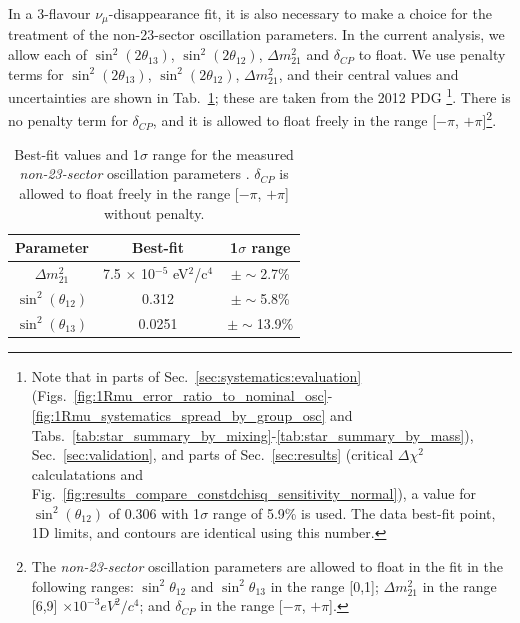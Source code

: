 In a 3-flavour $\nu_{\mu}$-disappearance fit, it is also necessary to make a choice for the treatment of the 
non-23-sector oscillation parameters. In the current analysis, we allow each of
$\sin^{2}(2 \theta_{13})$, $\sin^{2}(2 \theta_{12})$, $\Delta m_{21}^{2}$ and $\delta_{CP}$ to float. 
We use penalty terms for $\sin^{2}(2 \theta_{13})$, $\sin^{2}(2 \theta_{12})$, $\Delta m_{21}^{2}$, and their central values 
and uncertainties are shown in Tab.\ \ref{tab:pdg2012non23}; these are taken from the 2012 PDG \cite{PDG2012}\footnote{
  Note that in
  parts of Sec.\ \ref{sec:systematics:evaluation} (Figs.\ \ref{fig:1Rmu_error_ratio_to_nominal_osc}-\ref{fig:1Rmu_systematics_spread_by_group_osc}
  and Tabs.\ \ref{tab:star_summary_by_mixing}-\ref{tab:star_summary_by_mass}),
  Sec.\ \ref{sec:validation},
  and parts of Sec.\ \ref{sec:results} (critical $\Delta\chi^2$ calculatations and Fig.\ \ref{fig:results_compare_constdchisq_sensitivity_normal}),
  a value for $\sin^{2}(\theta_{12})$ of 0.306 with 1$\sigma$ range of 5.9\% \cite{FogliLisi} is used.
  The data best-fit point, 1D limits, and contours are identical using this number.
}.
There is no penalty term for 
$\delta_{CP}$, and it is allowed to float freely in the range [$-\pi$, $+\pi$]\footnote{
 The \emph{non-23-sector} oscillation parameters are allowed to float in the fit in the following ranges:
 $\sin^{2}\theta_{12}$ and $\sin^{2}\theta_{13}$ in the range [0,1];
 $\Delta m^{2}_{21}$ in the range [6,9] $\times 10^{-3} eV^{2}/c^{4}$;
 and $\delta_{CP}$ in the range [$-\pi$, $+\pi$].
}.
\begin{table}
\centering
\begin{tabular}{| c | c | c | }
\hline
Parameter                  &  Best-fit                                    & 1$\sigma$ range  \\
\hline
$\Delta m_{21}^{2}$        &  7.5 $\times$ 10$^{-5}$ eV$^{2}$/c$^{4}$     & $\pm\sim$2.7\% \\
$\sin^{2}(\theta_{12})$    &  0.312                                       & $\pm\sim$5.8\% \\
$\sin^{2}(\theta_{13})$    &  0.0251                                      & $\pm\sim$13.9\% \\
\hline
\end{tabular}
\caption{
  Best-fit values and 1$\sigma$ range for the measured \emph{non-23-sector} oscillation parameters \cite{PDG2012}.
  $\delta_{CP}$ is allowed to float freely in the range [$-\pi$, $+\pi$] without penalty.
}
\label{tab:pdg2012non23}
\end{table}

